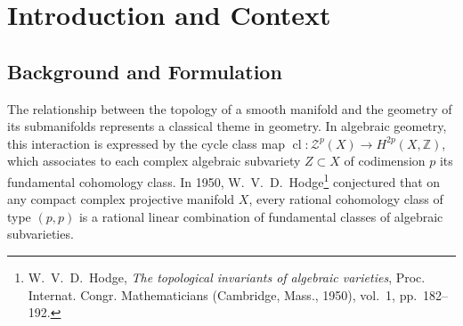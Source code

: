 \documentclass[11pt,a4paper]{article}
\theoremstyle{definition}
\theoremstyle{plain}
\DeclareMathOperator{\cl}{cl}
\begin{document}
\tableofcontents
\newpage

\section*{Introduction and Context}

\subsection*{Background and Formulation}
The relationship between the topology of a smooth manifold and the geometry of its submanifolds represents a classical theme in geometry. In algebraic geometry, this interaction is expressed by the cycle class map $\cl: \mathcal{Z}^p(X) \to H^{2p}(X, \mathbb{Z})$, which associates to each complex algebraic subvariety $Z \subset X$ of codimension $p$ its fundamental cohomology class. In 1950, W.~V.~D.~Hodge\footnote{W.~V.~D.~Hodge, \emph{The topological invariants of algebraic varieties}, Proc. Internat. Congr. Mathematicians (Cambridge, Mass., 1950), vol.~1, pp.~182--192.} conjectured that on any compact complex projective manifold $X$, every rational cohomology class of type $(p,p)$ is a rational linear combination of fundamental classes of algebraic subvarieties.
\end{document}
